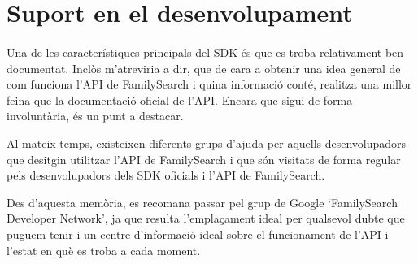 \section{Suport en el desenvolupament}

    \paragraph{}
    Una de les característiques principals del SDK és que es troba relativament ben documentat. Inclòs m'atreviria a dir, que de cara a obtenir una idea general de com funciona l’API de FamilySearch i quina informació conté, realitza una millor feina que la documentació oficial de l’API. Encara que sigui de forma involuntària, és un punt a destacar.

    Al mateix temps, existeixen diferents grups d'ajuda per aquells desenvolupadors que desitgin utilitzar l'API de FamilySearch i que són visitats de forma regular pels desenvolupadors dels SDK oficials i l’API de FamilySearch.

    Des d'aquesta memòria, es recomana passar pel grup de Google `FamilySearch Developer Network', ja que resulta l'emplaçament ideal per qualsevol dubte que puguem tenir i un centre d'informació ideal sobre el funcionament de l’API i l'estat en què es troba a cada moment.
